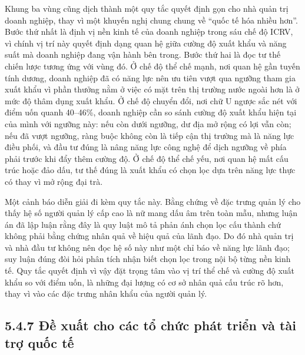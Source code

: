 \documentclass[
  a4paper,
  13pt]{extreport}
\begin{document}
Khung ba vùng cũng dịch thành một quy tắc quyết định gọn cho nhà quản
trị doanh nghiệp, thay vì một khuyến nghị chung chung về ``quốc tế hóa
nhiều hơn''. Bước thứ nhất là định vị nền kinh tế của doanh nghiệp trong
sáu chế độ ICRV, vì chính vị trí này quyết định dạng quan hệ giữa cường
độ xuất khẩu và năng suất mà doanh nghiệp đang vận hành bên trong. Bước
thứ hai là đọc tư thế chiến lược tương ứng với vùng đó. Ở chế độ thể chế
mạnh, nơi quan hệ gần tuyến tính dương, doanh nghiệp đã có năng lực nên
ưu tiên vượt qua ngưỡng tham gia xuất khẩu vì phần thưởng nằm ở việc có
mặt trên thị trường nước ngoài hơn là ở mức độ thâm dụng xuất khẩu. Ở
chế độ chuyển đổi, nơi chữ U ngược sắc nét với điểm uốn quanh 40--46\%,
doanh nghiệp cần so sánh cường độ xuất khẩu hiện tại của mình với ngưỡng
này: nếu còn dưới ngưỡng, dư địa mở rộng có lợi vẫn còn; nếu đã vượt
ngưỡng, ràng buộc không còn là tiếp cận thị trường mà là năng lực điều
phối, và đầu tư đúng là nâng năng lực công nghệ để dịch ngưỡng về phía
phải trước khi đẩy thêm cường độ. Ở chế độ thể chế yếu, nơi quan hệ mất
cấu trúc hoặc đảo dấu, tư thế đúng là xuất khẩu có chọn lọc dựa trên
năng lực thực có thay vì mở rộng đại trà.

Một cảnh báo diễn giải đi kèm quy tắc này. Bằng chứng về đặc trưng quản
lý cho thấy hệ số người quản lý cấp cao là nữ mang dấu âm trên toàn mẫu,
nhưng luận án đã lập luận rằng đây là quy luật mô tả phản ánh chọn lọc
cấu thành chứ không phải bằng chứng nhân quả về hiệu quả của lãnh đạo.
Do đó nhà quản trị và nhà đầu tư không nên đọc hệ số này như một chỉ báo
về năng lực lãnh đạo; suy luận đúng đòi hỏi phân tích nhận biết chọn lọc
trong nội bộ từng nền kinh tế. Quy tắc quyết định vì vậy đặt trọng tâm
vào vị trí thể chế và cường độ xuất khẩu so với điểm uốn, là những đại
lượng có cơ sở nhân quả cấu trúc rõ hơn, thay vì vào các đặc trưng nhân
khẩu của người quản lý.

\hypertarget{ux111ux1ec1-xuux1ea5t-cho-cuxe1c-tux1ed5-chux1ee9c-phuxe1t-triux1ec3n-vuxe0-tuxe0i-trux1ee3-quux1ed1c-tux1ebf}{%
\subsection{5.4.7 Đề xuất cho các tổ chức phát triển và tài trợ quốc
tế}\label{ux111ux1ec1-xuux1ea5t-cho-cuxe1c-tux1ed5-chux1ee9c-phuxe1t-triux1ec3n-vuxe0-tuxe0i-trux1ee3-quux1ed1c-tux1ebf}}
\end{document}
